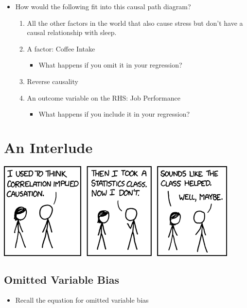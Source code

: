 \documentclass[
]{book}
\providecommand{\tightlist}{%
  \setlength{\itemsep}{0pt}\setlength{\parskip}{0pt}}
\theoremstyle{definition}
\theoremstyle{definition}
\theoremstyle{definition}
\theoremstyle{definition}
\theoremstyle{remark}
\begin{document}
\begin{itemize}
\tightlist
\item
  How would the following fit into this causal path diagram?

  \begin{enumerate}
  \def\labelenumi{\arabic{enumi}.}
  \tightlist
  \item
    All the other factors in the world that also cause stress but don't have a causal relationship with sleep.
  \item
    A factor: Coffee Intake

    \begin{itemize}
    \tightlist
    \item
      What happens if you omit it in your regression?
    \end{itemize}
  \item
    Reverse causality
  \item
    An outcome variable on the RHS: Job Performance

    \begin{itemize}
    \tightlist
    \item
      What happens if you include it in your regression?
    \end{itemize}
  \end{enumerate}
\end{itemize}

\section{An Interlude}\label{an-interlude}

\includegraphics[width=0.8\linewidth,height=\textheight,keepaspectratio]{./images/correlation.png}

\subsection{Omitted Variable Bias}\label{omitted-variable-bias}

\begin{itemize}
\tightlist
\item
  Recall the equation for omitted variable bias
\end{itemize}
\end{document}
